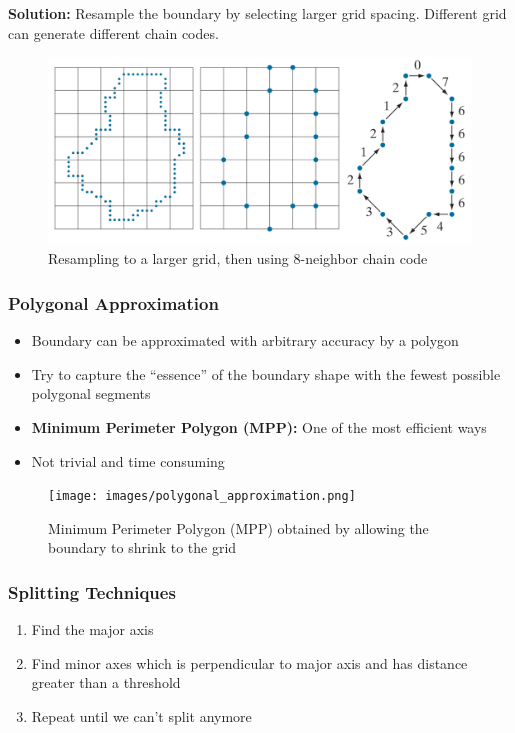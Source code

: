 \textbf{Solution:} Resample the boundary by selecting larger grid spacing.
Different grid can generate different chain codes.

\begin{figure}[H]
  \centering
  \includegraphics[width=\linewidth]{images/chain_code.png}
  \caption{Resampling to a larger grid, then using 8-neighbor chain code}
\end{figure}

\subsubsection*{Polygonal Approximation}

\begin{itemize}
  \item Boundary can be approximated with arbitrary accuracy by a polygon
  \item Try to capture the \enquote{essence} of the boundary shape
    with the fewest possible polygonal segments
  \item \textbf{Minimum Perimeter Polygon (MPP):} One of the most efficient ways
  \item Not trivial and time consuming
\end{itemize}

\begin{figure}[H]
  \centering
  \texttt{[image: images/polygonal\_approximation.png]}
  \caption{Minimum Perimeter Polygon (MPP) obtained by allowing the
  boundary to shrink to the grid}
\end{figure}

\subsubsection*{Splitting Techniques}

\begin{enumerate}

  \item Find the major axis
  \item Find minor axes which is perpendicular to major axis and has
    distance greater than a threshold
  \item Repeat until we can't split anymore
\end{enumerate}

